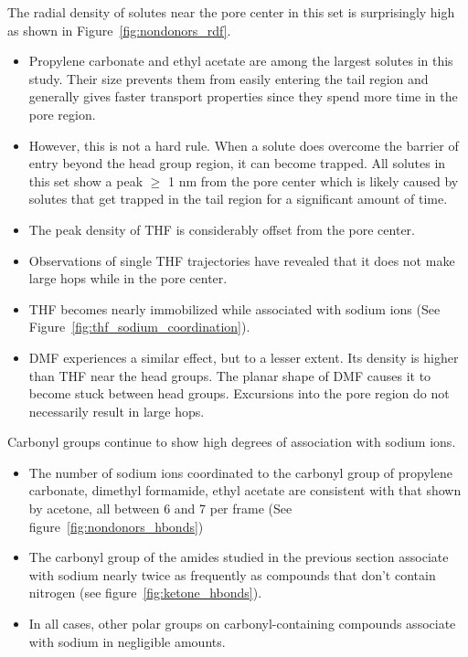 \documentclass{article}
\begin{document}
  \noindent The radial density of solutes near the pore center in this set is surprisingly high
  as shown in Figure~\ref{fig:nondonors_rdf}.
  \begin{itemize}
    \item Propylene carbonate and ethyl acetate are among the largest solutes
    in this study. Their size prevents them from easily entering the tail 
    region and generally gives faster transport properties since they spend
    more time in the pore region. 
    \item However, this is not a hard rule. When a solute does overcome the 
    barrier of entry beyond the head group region, it can become trapped. All
    solutes in this set show a peak $\geq$ 1 nm from the pore center which is
    likely caused by solutes that get trapped in the tail region for a significant
    amount of time.
	\item The peak density of THF is considerably offset from the pore center.
	\item Observations of single THF trajectories have revealed that it does not make
	large hops while in the pore center.
	\item THF becomes nearly immobilized while associated with sodium ions (See 
	Figure~\ref{fig:thf_sodium_coordination}).
	\item DMF experiences a similar effect, but to a lesser extent. Its density is 
	higher than THF near the head groups. The planar shape of DMF causes it to 
	become stuck between head groups. Excursions into the pore region do not
	necessarily result in large hops.
  \end{itemize}
  
  \noindent Carbonyl groups continue to show high degrees of association with sodium ions. 
  \begin{itemize}
    \item The number of sodium ions coordinated to the carbonyl group of 
    propylene carbonate, dimethyl formamide, ethyl acetate are consistent with 
    that shown by acetone, all between 6 and 7 per frame (See 
    figure~\ref{fig:nondonors_hbonds})
    \item The carbonyl group of the amides studied in the previous section
    associate with sodium nearly twice as frequently as compounds that don't
    contain nitrogen (see figure~\ref{fig:ketone_hbonds}).
    \item In all cases, other polar groups on carbonyl-containing compounds
    associate with sodium in negligible amounts.
  \end{itemize}
 
\end{document}

